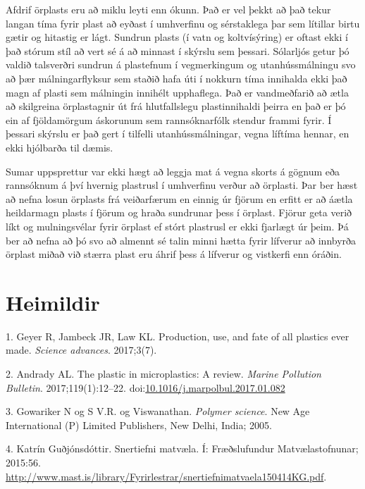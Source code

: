 \documentclass[icelandic,]{book}
\begin{document}
Afdrif örplasts eru að miklu leyti enn ókunn. Það er vel þekkt að það tekur langan tíma fyrir plast að eyðast í umhverfinu og sérstaklega þar sem lítillar birtu gætir og hitastig er lágt. Sundrun plasts (í vatn og koltvísýring) er oftast ekki í það stórum stíl að vert sé á að minnast í skýrslu sem þessari. Sólarljós getur þó valdið talsverðri sundrun á plastefnum í vegmerkingum og utanhússmálningu svo að þær málningarflyksur sem staðið hafa úti í nokkurn tíma innihalda ekki það magn af plasti sem málningin innihélt upphaflega. Það er vandmeðfarið að ætla að skilgreina örplastagnir út frá hlutfallslegu plastinnihaldi þeirra en það er þó ein af fjöldamörgum áskorunum sem rannsóknarfólk stendur frammi fyrir. Í þessari skýrslu er það gert í tilfelli utanhússmálningar, vegna líftíma hennar, en ekki hjólbarða til dæmis.

Sumar uppsprettur var ekki hægt að leggja mat á vegna skorts á gögnum eða rannsóknum á því hvernig plastrusl í umhverfinu verður að örplasti. Þar ber hæst að nefna losun örplasts frá veiðarfærum en einnig úr fjörum en erfitt er að áætla heildarmagn plasts í fjörum og hraða sundrunar þess í örplast. Fjörur geta verið líkt og mulningsvélar fyrir örplast ef stórt plastrusl er ekki fjarlægt úr þeim. Þá ber að nefna að þó svo að almennt sé talin minni hætta fyrir lífverur að innbyrða örplast miðað við stærra plast eru áhrif þess á lífverur og vistkerfi enn óráðin.


\hypertarget{heimildir}{%
\chapter*{Heimildir}\label{heimildir}}

\hypertarget{refs}{}
\leavevmode\hypertarget{ref-geyer2017production}{}%
1. Geyer R, Jambeck JR, Law KL. Production, use, and fate of all plastics ever made. \emph{Science advances}. 2017;3(7).

\leavevmode\hypertarget{ref-Andrady2017}{}%
2. Andrady AL. The plastic in microplastics: A review. \emph{Marine Pollution Bulletin}. 2017;119(1):12--22. doi:\href{https://doi.org/10.1016/j.marpolbul.2017.01.082}{10.1016/j.marpolbul.2017.01.082}

\leavevmode\hypertarget{ref-Gowariker2005}{}%
3. Gowariker N og S V.R. og Viswanathan. \emph{Polymer science}. New Age International (P) Limited Publishers, New Delhi, India; 2005.

\leavevmode\hypertarget{ref-Gudjonsdottir2015}{}%
4. Katrín Guðjónsdóttir. Snertiefni matvæla. Í: Fræðslufundur Matvælastofnunar; 2015:56. \url{http://www.mast.is/library/Fyrirlestrar/snertiefnimatvaela150414KG.pdf}.
\end{document}

